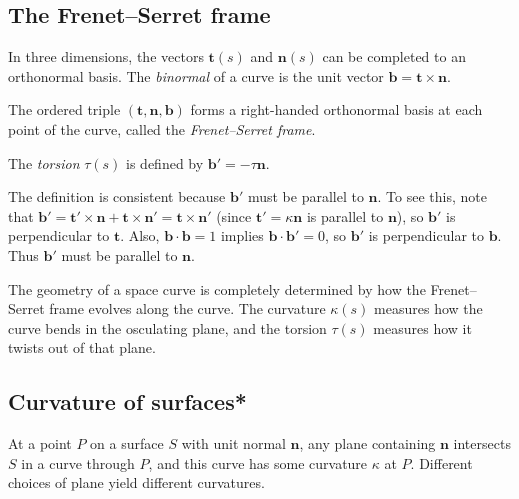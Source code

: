 \documentclass[a4paper]{article}
\begin{document}
\subsection{The Frenet--Serret frame}

\begin{defi}[Binormal]
  In three dimensions, the vectors $\mathbf{t}(s)$ and $\mathbf{n}(s)$ can be completed to an orthonormal basis. The \emph{binormal} of a curve is the unit vector $\mathbf{b} = \mathbf{t}\times \mathbf{n}$.
\end{defi}

\begin{defi}
  The ordered triple $(\mathbf{t}, \mathbf{n}, \mathbf{b})$ forms a right-handed orthonormal basis at each point of the curve, called the \emph{Frenet--Serret frame}.
\end{defi}

\begin{defi}[Torsion]
  The \emph{torsion} $\tau(s)$ is defined by $\mathbf{b}' = -\tau \mathbf{n}$.
\end{defi}

\begin{rmk}
  The definition is consistent because $\mathbf{b}'$ must be parallel to $\mathbf{n}$. To see this, note that $\mathbf{b}' = \mathbf{t}'\times \mathbf{n} + \mathbf{t}\times \mathbf{n}' = \mathbf{t}\times \mathbf{n}'$ (since $\mathbf{t}' = \kappa\mathbf{n}$ is parallel to $\mathbf{n}$), so $\mathbf{b}'$ is perpendicular to $\mathbf{t}$. Also, $\mathbf{b} \cdot \mathbf{b} = 1$ implies $\mathbf{b}\cdot \mathbf{b}' = 0$, so $\mathbf{b}'$ is perpendicular to $\mathbf{b}$. Thus $\mathbf{b}'$ must be parallel to $\mathbf{n}$.
\end{rmk}

\begin{rmk}
  The geometry of a space curve is completely determined by how the Frenet--Serret frame evolves along the curve. The curvature $\kappa(s)$ measures how the curve bends in the osculating plane, and the torsion $\tau(s)$ measures how it twists out of that plane.
\end{rmk}

\subsection{Curvature of surfaces*}

\begin{rmk}
  At a point $P$ on a surface $S$ with unit normal $\mathbf{n}$, any plane containing $\mathbf{n}$ intersects $S$ in a curve through $P$, and this curve has some curvature $\kappa$ at $P$. Different choices of plane yield different curvatures.
\end{rmk}
\end{document}
